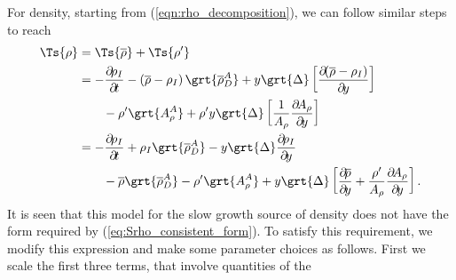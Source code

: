 {%

For density, starting from (\ref{eqn:rho_decomposition}), we can follow similar
steps to reach
%
\begin{equation}
\begin{aligned}
\Ts{\rho} &= \Ts{\mean{\rho}} + \Ts{\fluc{\rho}} \\
   & = - \pp{\rho_I}{t}
       -\left(\mean{\rho}-\rho_I\right)
          \grt{\mean{\rho}_D^A}
      + y \grt{\Delta}
           \left[
             \pp{\left(\mean{\rho}-\rho_I\right)}{y}
         \right] \notag \\
   & \qquad   -\fluc{\rho}
           \grt{A_\rho^A}
      + \fluc{\rho} y \grt{\Delta} \left[
             \frac{1}{A_{\rho}} \pp{A_{\rho}}{y}
         \right] \\
   & = - \pp{\rho_I}{t}
       + \rho_I \grt{\mean{\rho}_D^A}
       - y \grt{\Delta} \pp{\rho_I}{y} \\
   & \qquad  -\mean{\rho} \grt{\mean{\rho}_D^A} -\fluc{\rho} \grt{A_\rho^A}
       + y \grt{\Delta} \left[
                \pp{\mean{\rho}}{y} + \frac{\fluc{\rho}}{A_{\rho}} \pp{A_{\rho}}{y}
             \right].
\end{aligned}
\end{equation}
%
It is seen that this model for the slow growth source of density does not have
the form required by (\ref{eq:Srho_consistent_form}). To satisfy this
requirement, we modify this expression and make some parameter choices as
follows. First we scale the first three terms, that involve quantities of the
}
